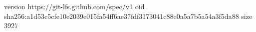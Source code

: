 version https://git-lfs.github.com/spec/v1
oid sha256:a1d53c5cfe10e2039e015fa54ff6ae37fdf3173041c88e0a5a7b5a54a3f5da88
size 3927
